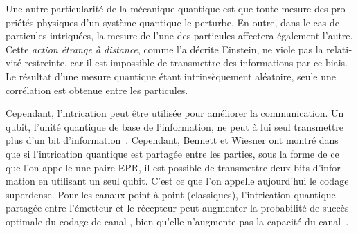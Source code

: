 \begin{otherlanguage}{french}
Une autre particularité de la mécanique quantique est que toute mesure des propriétés physiques d'un système quantique le perturbe. En outre, dans le cas de particules intriquées, la mesure de l'une des particules affectera également l'autre. Cette \emph{action étrange à distance}, comme l'a décrite Einstein, ne viole pas la relativité restreinte, car il est impossible de transmettre des informations par ce biais. Le résultat d'une mesure quantique étant intrinsèquement aléatoire, seule une corrélation est obtenue entre les particules.

Cependant, l'intrication peut être utilisée pour améliorer la communication. Un qubit, l'unité quantique de base de l'information, ne peut à lui seul transmettre plus d'un bit d'information~\cite{Holevo73}. Cependant, Bennett et Wiesner ont montré dans~\cite{BW92} que si l'intrication quantique est partagée entre les parties, sous la forme de ce que l'on appelle une paire EPR, il est possible de transmettre deux bits d'information en utilisant un seul qubit. C'est ce que l'on appelle aujourd'hui le codage superdense. Pour les canaux point à point (classiques), l'intrication quantique partagée entre l'émetteur et le récepteur peut augmenter la probabilité de succès optimale du codage de canal \cite{CLMW10,PLMKR11}, bien qu'elle n'augmente pas la capacité du canal~\cite{BBCJPW93,BSST99}.


\end{otherlanguage}
